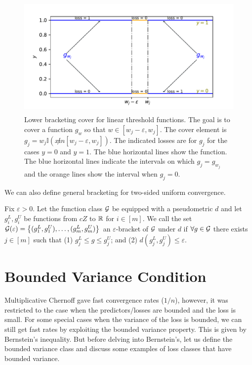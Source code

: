 \documentclass[twoside]{article}
\newcommand{\set}[1]{\left\{#1\right\}}
\newcommand{\I}{\mathbb{I}}
\begin{document}
\begin{figure}
    \centering
    \includegraphics[width=12cm, height=6cm]{figures/loss.pdf}
     \caption{Lower bracketing cover for linear threshold functions. The goal is to cover a function $g_w$ so that $w \in [w_j-\varepsilon, w_j]$. The cover element is $g_j = w_j \I(x \not in [w_j-\varepsilon, w_j])$. The indicated losses are for $g_j$ for the cases $y=0$ and $y=1$. The blue horizontal lines show the function. The blue horizontal lines indicate the intervals on which $g_j = g_{w_j}$ and the orange lines show the interval when $g_j = 0$.}
    \label{fig:lb}
\end{figure}

We can also define general bracketing for two-sided uniform convergence.
\begin{definition}[Bracketing]
    Fix $\varepsilon > 0$. Let the function class $\mathcal{G}$ be equipped with a pseudometric $d$ and let $g_i^L, g_i^U$ be functions from $cZ$ to $\mathbb{R}$ for $i \in [m]$. We call the set $\cG(\varepsilon) = \set{(g_1^L, g_1^U), \dots, (g_m^L, g_m^U) }$ an $\varepsilon$-bracket of $\mathcal{G}$ under $d$ if $\forall g \in \mathcal{G}$ there exists $j \in [m]$ such that (1) $g_j^L \le g \le g_j^U$; and (2) $d(g_j^L, g_j^U) \le \varepsilon$.
\end{definition}

\section{Bounded Variance Condition}
Multiplicative Chernoff gave fast convergence rates ($1/n$), however, it was restricted to the case when the predictors/losses are bounded and the loss is small. For some special cases when the variance of the loss is bounded, we can still get fast rates by exploiting the bounded variance property. This is given by Bernstein's inequality. But before delving into Bernstein's, let us define the bounded variance class and discuss some examples of loss classes that have bounded variance.   
\end{document}
